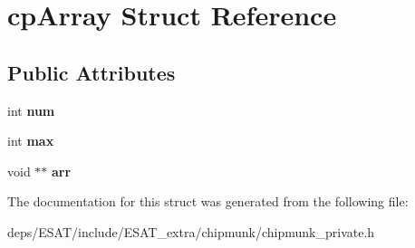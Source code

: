 \hypertarget{structcp_array}{}\section{cp\+Array Struct Reference}
\label{structcp_array}
\subsection*{Public Attributes}
\begin{DoxyCompactItemize}
\item 
\mbox{\label{structcp_array_a7e4b3a68ae2f403be9cfdac83f1059e5}} 
int {\bfseries num}
\item 
\mbox{\label{structcp_array_af716e2d8fd33cdb3278b123b6f5479e2}} 
int {\bfseries max}
\item 
\mbox{\label{structcp_array_a2a69d85aa1cd455427b7df267d7d6ed5}} 
void $\ast$$\ast$ {\bfseries arr}
\end{DoxyCompactItemize}


The documentation for this struct was generated from the following file\+:\begin{DoxyCompactItemize}
\item 
deps/\+E\+S\+A\+T/include/\+E\+S\+A\+T\+\_\+extra/chipmunk/chipmunk\+\_\+private.\+h\end{DoxyCompactItemize}
